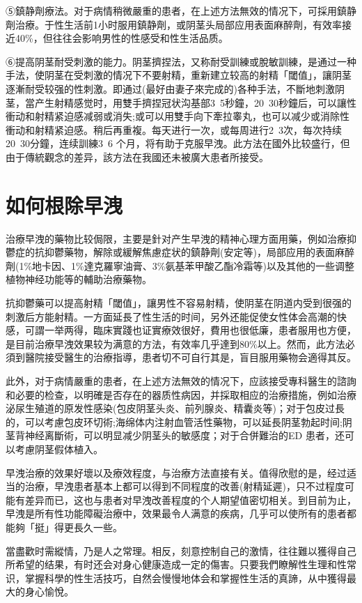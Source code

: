 \documentclass[12pt,UTF8]{ctexbook}
\begin{document}
⑤鎮静劑療法。对于病情稍微嚴重的患者，在上述方法無效的情况下，可採用鎮静劑治療。于性生活前1小时服用鎮静劑，或阴茎头局部应用表面麻醉劑，有效率接近40\%，但往往会影响男性的性感受和性生活品质。

⑥提高阴茎耐受刺激的能力。阴茎擠捏法，又称耐受訓練或脫敏訓練，是通过一种手法，使阴茎在受刺激的情况下不要射精，重新建立较高的射精「閾值」，讓阴茎逐漸耐受较强的性刺激。即通过(最好由妻子來完成的)各种手法，不斷地刺激阴茎，當产生射精感觉时，用雙手擠捏冠状沟基部3~5秒鐘，20~30秒鐘后，可以讓性衝动和射精紧迫感减弱或消失;或可以用雙手向下牽拉睾丸，也可以减少或消除性衝动和射精紧迫感。稍后再重複。每天进行一次，或每周进行2~3次，每次持续20~30分鐘，连续訓練3~6 个月，将有助于克服早洩。此方法在國外比较盛行，但由于傳統觀念的差异，該方法在我國还未被廣大患者所接受。

\section{如何根除早洩}

治療早洩的藥物比较侷限，主要是針对产生早洩的精神心理方面用藥，例如治療抑鬱症的抗抑鬱藥物，解除或緩解焦慮症状的鎮静劑(安定等)，局部应用的表面麻醉劑(1\%地卡因、1\%達克羅寧油膏、3\%氨基苯甲酸乙酯冷霜等)以及其他的一些调整植物神经功能等的輔助治療藥物。

抗抑鬱藥可以提高射精「閾值」，讓男性不容易射精，使阴茎在阴道内受到很强的刺激后方能射精。一方面延長了性生活的时间，另外还能促使女性体会高潮的快感，可謂一举两得，臨床實踐也证實療效很好，費用也很低廉，患者服用也方便，是目前治療早洩效果较为满意的方法，有效率几乎達到80\%以上。然而，此方法必須到醫院接受醫生的治療指導，患者切不可自行其是，盲目服用藥物会適得其反。

此外，对于病情嚴重的患者，在上述方法無效的情况下，应該接受專科醫生的諮詢和必要的检查，以明確是否存在的器质性病因，并採取相应的治療措施，例如治療泌尿生殖道的原发性感染(包皮阴茎头炎、前列腺炎、精囊炎等)；对于包皮过長的，可以考慮包皮环切術;海绵体内注射血管活性藥物，可以延長阴茎勃起时间;阴茎背神经离斷術，可以明显减少阴茎头的敏感度；对于合併難治的ED 患者，还可以考慮阴茎假体植入。

早洩治療的效果好壞以及療效程度，与治療方法直接有关。值得欣慰的是，经过适当的治療，早洩患者基本上都可以得到不同程度的改善(射精延遲)，只不过程度可能有差异而已，这也与患者对早洩改善程度的个人期望值密切相关。到目前为止，早洩是所有性功能障礙治療中，效果最令人满意的疾病，几乎可以使所有的患者都能夠「挺」得更長久一些。

當盡歡时需縱情，乃是人之常理。相反，刻意控制自己的激情，往往難以獲得自己所希望的结果，有时还会对身心健康造成一定的傷害。只要我們瞭解性生理和性常识，掌握科學的性生活技巧，自然会慢慢地体会和掌握性生活的真諦，从中獲得最大的身心愉悅。
\end{document}
